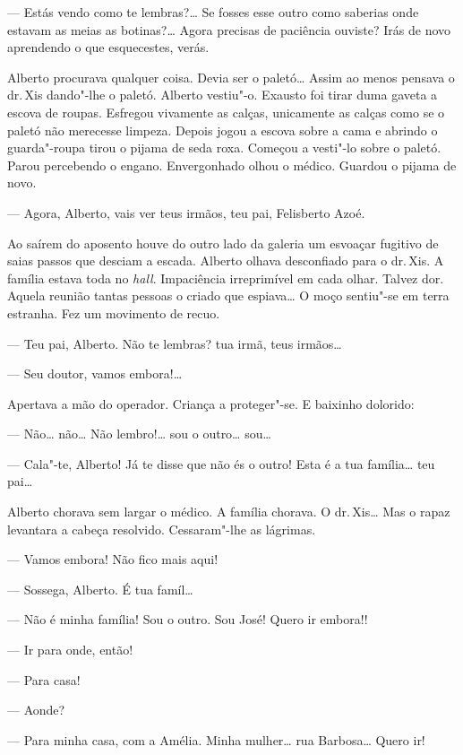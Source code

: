 --- Estás vendo como te lembras?\ldots{} Se fosses esse outro como saberias
onde estavam as meias as botinas?\ldots{} Agora precisas de paciência
ouviste? Irás de novo aprendendo o que esquecestes, verás.

Alberto procurava qualquer coisa. Devia ser o paletó\ldots{} Assim ao menos
pensava o dr.\,Xis dando"-lhe o paletó. Alberto vestiu"-o. Exausto foi
tirar duma gaveta a escova de roupas. Esfregou vivamente as calças,
unicamente as calças como se o paletó não merecesse limpeza. Depois
jogou a escova sobre a cama e abrindo o guarda"-roupa tirou o pijama de
seda roxa. Começou a vesti"-lo sobre o paletó. Parou percebendo o engano.
Envergonhado olhou o médico. Guardou o pijama de novo.

--- Agora, Alberto, vais ver teus irmãos, teu pai, Felisberto Azoé.

Ao saírem do aposento houve do outro lado da galeria um esvoaçar
fugitivo de saias passos que desciam a escada. Alberto olhava
desconfiado para o dr.\,Xis. A família estava toda no \emph{hall}.
Impaciência irreprimível em cada olhar. Talvez dor. Aquela reunião
tantas pessoas o criado que espiava\ldots{} O moço sentiu"-se em terra
estranha. Fez um movimento de recuo.

--- Teu pai, Alberto. Não te lembras? tua irmã, teus irmãos\ldots{}

--- Seu doutor, vamos embora!\ldots{}

Apertava a mão do operador. Criança a proteger"-se. E baixinho dolorido:

--- Não\ldots{} não\ldots{} Não lembro!\ldots{} sou o outro\ldots{} sou\ldots{}

--- Cala"-te, Alberto! Já te disse que não és o outro! Esta é a tua
família\ldots{} teu pai\ldots{}

Alberto chorava sem largar o médico. A família chorava. O dr.\,Xis\ldots{} Mas
o rapaz levantara a cabeça resolvido. Cessaram"-lhe as lágrimas.

--- Vamos embora! Não fico mais aqui!

--- Sossega, Alberto. É tua famíl\ldots{}

--- Não é minha família! Sou o outro. Sou José! Quero ir embora!!

--- Ir para onde, então!

--- Para casa!

--- Aonde?

--- Para minha casa, com a Amélia. Minha mulher\ldots{} rua Barbosa\ldots{} Quero
ir!

